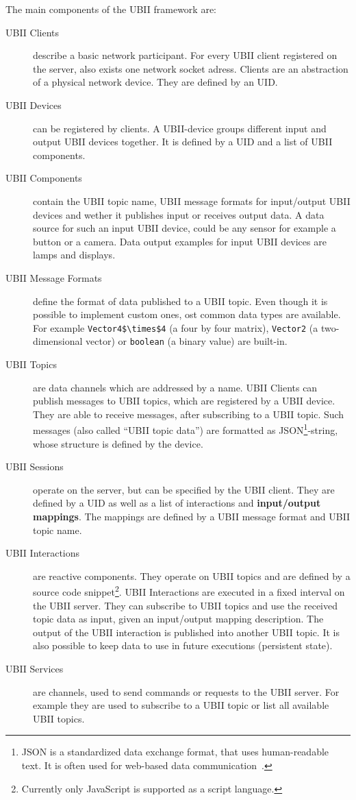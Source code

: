 The main components of the \ac{UBII} framework are:
\begin{description}
	\item[\ac{UBII} Clients] describe a basic network participant. For every \ac{UBII} client registered on the server, also exists one network socket adress. Clients are an abstraction of a physical network device. They are defined by an \ac{UID}. 
	\item[\ac{UBII} Devices] can be registered by clients. A \ac{UBII}-device groups different input and output \ac{UBII} devices together. It is defined by a \ac{UID} and a list of \ac{UBII} components.
  \item[\ac{UBII} Components] contain the \ac{UBII} topic name, \ac{UBII} message formats for input/output \ac{UBII} devices and wether it publishes input or receives output data. A data source for such an input \ac{UBII} device, could be any sensor for example a button or a camera. Data output examples for input \ac{UBII} devices are lamps and displays.
  \item[\ac{UBII} Message Formats] define the format of data published to a \ac{UBII} topic. Even though it is possible to implement custom ones, ost common data types are available. For example \lstinline[mathescape=true]{Vector4$\times$4} (a four by four matrix), \lstinline{Vector2} (a two-dimensional vector) or \lstinline{boolean} (a binary value) are built-in. %
	\item[\ac{UBII} Topics] are data channels which are addressed by a name. \ac{UBII} Clients can publish messages to \ac{UBII} topics, which are registered by a \ac{UBII} device. They are able to receive messages, after subscribing to a \ac{UBII} topic. Such messages (also called \enquote{\ac{UBII} topic data}) are formatted as JSON\footnote{JSON is a standardized data exchange format, that uses human-readable text. It is often used for web-based data communication~\cite[iii]{ECMAInternational.2017}.}-string, whose structure is defined by the device.
	\item[\ac{UBII} Sessions] operate on the server, but can be specified by the \ac{UBII} client. They are defined by a \ac{UID} as well as a list of interactions and \textbf{input/output mappings}. The mappings are defined by a \ac{UBII} message format and \ac{UBII} topic name.
	\item[\ac{UBII} Interactions] are reactive components. They operate on \ac{UBII} topics and are defined by a source code snippet\footnote{Currently only JavaScript is supported as a script language.}. \ac{UBII} Interactions are executed in a fixed interval on the \ac{UBII} server. They can subscribe to \ac{UBII} topics and use the received topic data as input, given an input/output mapping description. The output of the \ac{UBII} interaction is published into another \ac{UBII} topic. It is also possible to keep data to use in future executions (persistent state).
	\item[\ac{UBII} Services] are channels, used to send commands or requests to the \ac{UBII} server. For example they are used to subscribe to a \ac{UBII} topic or list all available \ac{UBII} topics.
\end{description}

